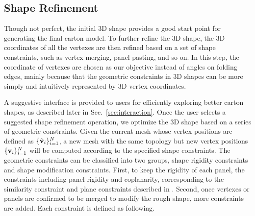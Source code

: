 


\subsection{Shape Refinement}\label{sec:refinement}

Though not perfect, the initial 3D shape provides a good start point for generating the final carton model. 
%
To further refine the 3D shape, the 3D coordinates of all the vertexes are then refined based on a set of shape constraints, such as vertex merging, panel pasting, and so on.
%
In this step, the coordinate of vertexes are chosen as our objective instead of angles on folding edges, mainly because that the geometric constraints in 3D shapes can be more simply and intuitively represented by 3D vertex coordinates.



A suggestive interface is provided to users for efficiently exploring better carton shapes, as described later in Sec.~\ref{sec:interaction}. 
%
Once the user selects a suggested shape refinement operation, we optimize the 3D shape based on a series of geometric constraints.
Given the current mesh whose vertex positions are defined as $\{\hat{\mathbf{v}}_i\}^{N}_{i=1}$, a new mesh with the same topology but new vertex positions $\{\mathbf{v}_i\}^{N}_{i=1}$ will be computed according to the specified shape constraints.
%
The geometric constraints can be classified into two groups, shape rigidity constraints and shape modification constraints.
% 
First, to keep the rigidity of each panel, the constraints including panel rigidity and coplanarity, corresponding to the similarity constraint and plane constraints described in \cite{Bouaziz:2012:SSD:2346796.2346802}. 
%
Second, once vertexes or panels are confirmed to be merged to modify the rough shape, more constraints are added. 
%
Each constraint is defined as following.  

